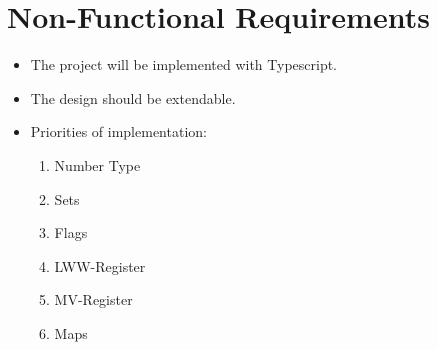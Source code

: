 \documentclass{scrreprt}
\begin{document}
	\section{Non-Functional Requirements}
	\begin{itemize}
	\item The project will be implemented with Typescript.
	\item The design should be extendable.
	\item Priorities of implementation:
	\begin{enumerate}
	\item Number Type
	\item Sets
	\item Flags
	\item LWW-Register
	\item MV-Register
	\item Maps
	\end{enumerate}
	\end{itemize}
	
\end{document}
